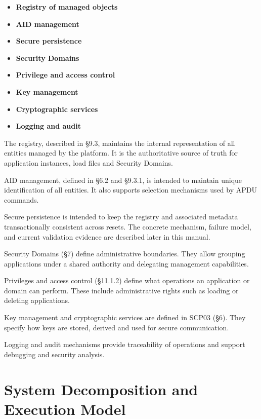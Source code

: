 \begin{itemize}
\item \textbf{Registry of managed objects} 
\item \textbf{AID management} 
\item \textbf{Secure persistence} 
\item \textbf{Security Domains} 
\item \textbf{Privilege and access control} 
\item \textbf{Key management} 
\item \textbf{Cryptographic services} 
\item \textbf{Logging and audit} 
\end{itemize}

The registry, described in §9.3, maintains the internal representation of all
entities managed by the platform. It is the authoritative source of truth for
application instances, load files and Security Domains.

AID management, defined in §6.2 and §9.3.1, is intended to maintain unique
identification of all entities. It also supports selection mechanisms used by
APDU commands.

Secure persistence is intended to keep the registry and associated metadata
transactionally consistent across resets. The concrete mechanism, failure
model, and current validation evidence are described later in this manual.

Security Domains (§7) define administrative boundaries. They allow grouping
applications under a shared authority and delegating management capabilities.

Privileges and access control (§11.1.2) define what operations an application
or domain can perform. These include administrative rights such as loading or
deleting applications.

Key management and cryptographic services are defined in SCP03 (§6). They
specify how keys are stored, derived and used for secure communication.

Logging and audit mechanisms provide traceability of operations and support
debugging and security analysis.

\section{System Decomposition and Execution Model}

